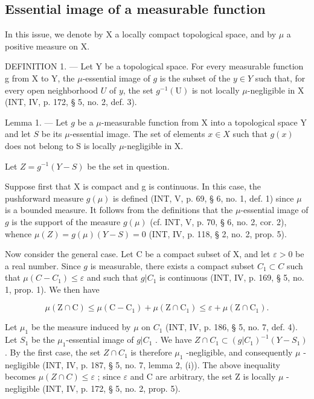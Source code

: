 \subsection{Essential image of a measurable function}

In this issue, we denote by X a locally compact topological space, and by \(\mu\) a positive measure on X.

DEFINITION 1. --- Let Y be a topological space. For every measurable function g from X to Y, the \(\mu\)-essential image of \(g\) is the subset of the \(y \in Y\) such that, for every open neighborhood \(U\) of \(y\), the set \(g^{-1}(\mathrm{U})\) is not locally \(\mu\)-negligible in X (INT, IV, p. 172, § 5, no. 2, def. 3).

Lemma 1. --- Let \(g\) be a \(\mu\)-measurable function from X into a topological space Y and let \(S\) be its \(\mu\)-essential image. The set of elements \(x \in X\) such that \(g(x)\) does not belong to S is locally \(\mu\)-negligible in X.

Let \(Z = g^{-1}(Y - S)\) be the set in question.

Suppose first that X is compact and g is continuous. In this case, the pushforward measure \(g(\mu)\) is defined (INT, V, p. 69, § 6, no. 1, def. 1) since \(\mu\) is a bounded measure. It follows from the definitions that the \(\mu\)-essential image of \(g\) is the support of the measure \(g(\mu)\) (cf. INT, V, p. 70, § 6, no. 2, cor. 2), whence \(\mu(Z) = g(\mu)(Y - S) = 0\) (INT, IV, p. 118, § 2, no. 2, prop. 5).

Now consider the general case. Let C be a compact subset of X, and let \(\varepsilon > 0\) be a real number. Since \(g\) is measurable, there exists a compact subset \(C_1 \subset C\) such that \(\mu(C - C_1) \leqslant \varepsilon\) and such that \(g|C_1\) is continuous (INT, IV, p. 169, § 5, no. 1, prop. 1). We then have

\[
\mu (\mathrm{Z} \cap \mathrm{C}) \leqslant \mu (\mathrm{C} - \mathrm{C} _ {1}) + \mu (\mathrm{Z} \cap \mathrm{C} _ {1}) \leqslant \varepsilon + \mu (\mathrm{Z} \cap \mathrm{C} _ {1}).
\]

Let \(\mu_{1}\) be the measure induced by \(\mu\) on \(C_{1}\) (INT, IV, p. 186, § 5, no. 7, def. 4). Let \(S_{1}\) be the \(\mu_{1}\)-essential image of \(g|C_{1}\) . We have \(Z\cap C_{1}\subset(g|C_{1})^{-1}(Y-S_{1})\) . By the first case, the set \(Z\cap C_{1}\) is therefore \(\mu_{1}\) -negligible, and consequently \(\mu\) -negligible (INT, IV, p. 187, § 5, no. 7, lemma 2, (i)). The above inequality becomes \(\mu(Z\cap C)\leqslant\varepsilon\) ; since \(\varepsilon\) and C are arbitrary, the set Z is locally \(\mu\) -negligible (INT, IV, p. 172, § 5, no. 2, prop. 5).

